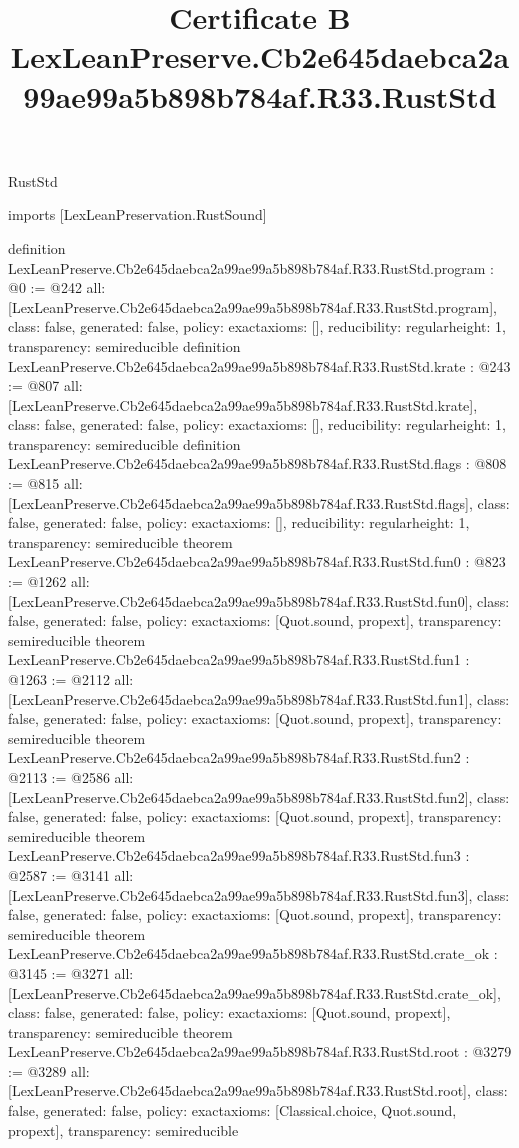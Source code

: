 \begin{lexlean}{RustStd}
\title{Certificate B LexLeanPreserve.Cb2e645daebca2a99ae99a5b898b784af.R33.RustStd}
\begin{coremodule}
imports [LexLeanPreservation.RustSound]

definition LexLeanPreserve.Cb2e645daebca2a99ae99a5b898b784af.R33.RustStd.program : @0 := @242 {
  all: [LexLeanPreserve.Cb2e645daebca2a99ae99a5b898b784af.R33.RustStd.program],
  class: false,
  generated: false,
  policy: exact{axioms: []},
  reducibility: regular{height: 1},
  transparency: semireducible
}
definition LexLeanPreserve.Cb2e645daebca2a99ae99a5b898b784af.R33.RustStd.krate : @243 := @807 {
  all: [LexLeanPreserve.Cb2e645daebca2a99ae99a5b898b784af.R33.RustStd.krate],
  class: false,
  generated: false,
  policy: exact{axioms: []},
  reducibility: regular{height: 1},
  transparency: semireducible
}
definition LexLeanPreserve.Cb2e645daebca2a99ae99a5b898b784af.R33.RustStd.flags : @808 := @815 {
  all: [LexLeanPreserve.Cb2e645daebca2a99ae99a5b898b784af.R33.RustStd.flags],
  class: false,
  generated: false,
  policy: exact{axioms: []},
  reducibility: regular{height: 1},
  transparency: semireducible
}
theorem LexLeanPreserve.Cb2e645daebca2a99ae99a5b898b784af.R33.RustStd.fun0 : @823 := @1262 {
  all: [LexLeanPreserve.Cb2e645daebca2a99ae99a5b898b784af.R33.RustStd.fun0],
  class: false,
  generated: false,
  policy: exact{axioms: [Quot.sound, propext]},
  transparency: semireducible
}
theorem LexLeanPreserve.Cb2e645daebca2a99ae99a5b898b784af.R33.RustStd.fun1 : @1263 := @2112 {
  all: [LexLeanPreserve.Cb2e645daebca2a99ae99a5b898b784af.R33.RustStd.fun1],
  class: false,
  generated: false,
  policy: exact{axioms: [Quot.sound, propext]},
  transparency: semireducible
}
theorem LexLeanPreserve.Cb2e645daebca2a99ae99a5b898b784af.R33.RustStd.fun2 : @2113 := @2586 {
  all: [LexLeanPreserve.Cb2e645daebca2a99ae99a5b898b784af.R33.RustStd.fun2],
  class: false,
  generated: false,
  policy: exact{axioms: [Quot.sound, propext]},
  transparency: semireducible
}
theorem LexLeanPreserve.Cb2e645daebca2a99ae99a5b898b784af.R33.RustStd.fun3 : @2587 := @3141 {
  all: [LexLeanPreserve.Cb2e645daebca2a99ae99a5b898b784af.R33.RustStd.fun3],
  class: false,
  generated: false,
  policy: exact{axioms: [Quot.sound, propext]},
  transparency: semireducible
}
theorem LexLeanPreserve.Cb2e645daebca2a99ae99a5b898b784af.R33.RustStd.crate_ok : @3145 := @3271 {
  all: [LexLeanPreserve.Cb2e645daebca2a99ae99a5b898b784af.R33.RustStd.crate_ok],
  class: false,
  generated: false,
  policy: exact{axioms: [Quot.sound, propext]},
  transparency: semireducible
}
theorem LexLeanPreserve.Cb2e645daebca2a99ae99a5b898b784af.R33.RustStd.root : @3279 := @3289 {
  all: [LexLeanPreserve.Cb2e645daebca2a99ae99a5b898b784af.R33.RustStd.root],
  class: false,
  generated: false,
  policy: exact{axioms: [Classical.choice, Quot.sound, propext]},
  transparency: semireducible
}


\end{coremodule}
\end{lexlean}
